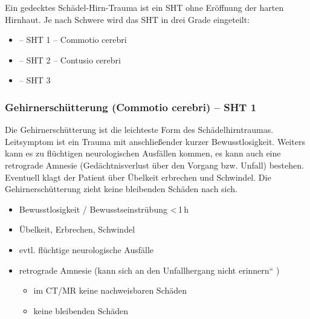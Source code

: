Ein gedecktes Schädel-Hirn-Trauma ist ein SHT ohne Eröffnung der harten
Hirnhaut. Je nach Schwere wird das SHT in drei Grade eingeteilt:

\begin{itemize}
\item {} -- SHT 1{\textdegree} --
Commotio cerebri
\item {} -- SHT 2{\textdegree} -- Contusio
cerebri
\item {} -- SHT 3{\textdegree} 
\end{itemize}

\subsubsection{Gehirnerschütterung (Commotio cerebri) --
SHT 1\textdegree}

{
Die Gehirnerschütterung ist die leichteste Form des
Schädelhirntraumas. Leitsymptom ist ein Trauma mit
anschließender kurzer Bewusstlosigkeit. Weiters kann es zu
flüchtigen neurologischen Ausfällen kommen, es kann auch eine
retrograde Amnesie (Gedächtnisverlust über den Vorgang
bzw. Unfall) bestehen. Eventuell klagt der Patient über
Übelkeit erbrechen und Schwindel. Die Gehirnerschütterung
zieht keine bleibenden Schäden nach sich.
}{
\begin{itemize}
    \item  Bewusstlosigkeit / Bewusstseinstrübung
    {\textless}\,1\,h
    \item Übelkeit, Erbrechen, Schwindel
    \item evtl. flüchtige neurologische Ausfälle
    \item retrograde  Amnesie  ({\quotedblbase}kann sich an den
    Unfallhergang nicht erinnern{\textquotedblleft} )
    \begin{itemize}
        \item im CT/MR 
        keine nachweisbaren Schäden
        \item keine  bleibenden Schäden
    \end{itemize}
\end{itemize}
}{}{}{}




